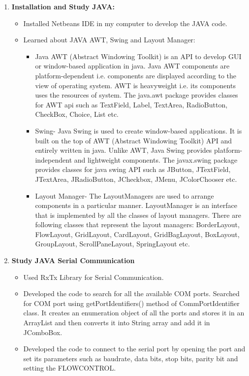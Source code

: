 \documentclass{article}
\begin{document}
	\begin{enumerate}
	 	\item \textbf{\large Installation and Study JAVA:}
	 	\begin{itemize}
			\item Installed Netbeans IDE in my computer to develop the JAVA code.
			\item Learned about JAVA AWT, Swing and Layout Manager:
			\begin{itemize}
				\item Java AWT (Abstract Windowing Toolkit) is an API to develop GUI or window-based application in java. Java AWT components are platform-dependent i.e. components are displayed according to the view of operating system. AWT is heavyweight i.e. its components uses the resources of system. The java.awt package provides classes for AWT api such as TextField, Label, TextArea, RadioButton, CheckBox, Choice, List etc.
				\item Swing- Java Swing is used to create window-based applications. It is built on the top of AWT (Abstract Windowing Toolkit) API and entirely written in java. Unlike AWT, Java Swing provides platform-independent and lightweight components. The javax.swing package provides classes for java swing API such as JButton, JTextField, JTextArea, JRadioButton, JCheckbox, JMenu, JColorChooser etc.
				\item Layout Manager- The LayoutManagers are used to arrange components in a particular manner. LayoutManager is an interface that is implemented by all the classes of layout managers. There are following classes that represent the layout managers: BorderLayout, FlowLayout, GridLayout, CardLayout, GridBagLayout, BoxLayout, GroupLayout, ScrollPaneLayout, SpringLayout etc.
			\end{itemize}
		\end{itemize}
		\item \textbf{\large Study JAVA Serial Communication} 
		\begin{itemize}
			\item Used RxTx Library for Serial Communication.
			\item Developed the code to search for all the available COM ports. Searched for COM port using getPortIdentifiers() method of CommPortIdentifier class. It creates an enumeration object of all the ports and stores it in an ArrayList and then converts it into String array and add it in JComboBox. 
		    \item Developed the code to connect to the serial port by opening the port and set its parameters such as baudrate, data bits, stop bits, parity bit and setting the FLOWCONTROL. \\

\end{itemize}
\end{enumerate}
\end{document}
